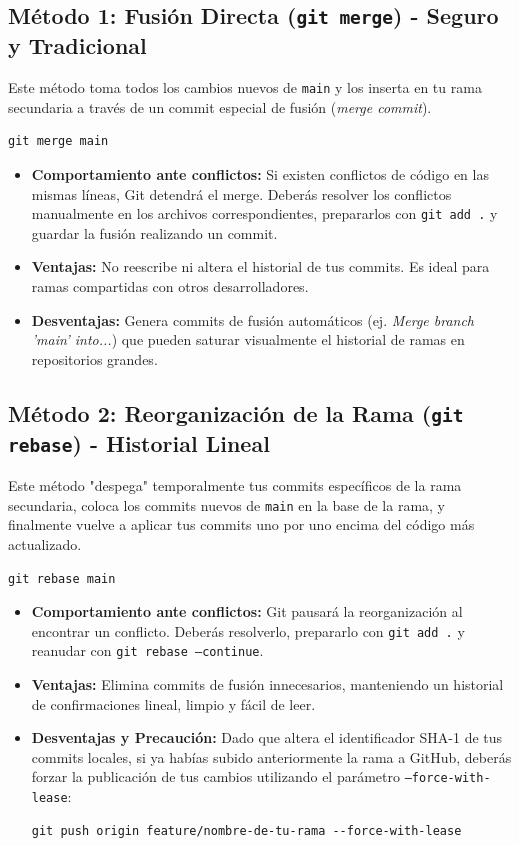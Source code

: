 \documentclass[
10pt, %
a4paper, %
oneside, %
headinclude,footinclude, %
BCOR5mm, %
]{scrartcl}
\begin{document}
\subsection{Método 1: Fusión Directa (\texttt{git merge}) - Seguro y Tradicional}
Este método toma todos los cambios nuevos de \texttt{main} y los inserta en tu rama secundaria a través de un commit especial de fusión (\textit{merge commit}).

\begin{lstlisting}[language=DOS]
git merge main
\end{lstlisting}

\begin{itemize}
	\item \textbf{Comportamiento ante conflictos:} Si existen conflictos de código en las mismas líneas, Git detendrá el merge. Deberás resolver los conflictos manualmente en los archivos correspondientes, prepararlos con \texttt{git add .} y guardar la fusión realizando un commit.
	\item \textbf{Ventajas:} No reescribe ni altera el historial de tus commits. Es ideal para ramas compartidas con otros desarrolladores.
	\item \textbf{Desventajas:} Genera commits de fusión automáticos (ej. \textit{Merge branch 'main' into...}) que pueden saturar visualmente el historial de ramas en repositorios grandes.
\end{itemize}

\subsection{Método 2: Reorganización de la Rama (\texttt{git rebase}) - Historial Lineal}
Este método "despega" temporalmente tus commits específicos de la rama secundaria, coloca los commits nuevos de \texttt{main} en la base de la rama, y finalmente vuelve a aplicar tus commits uno por uno encima del código más actualizado.

\begin{lstlisting}[language=DOS]
git rebase main
\end{lstlisting}

\begin{itemize}
	\item \textbf{Comportamiento ante conflictos:} Git pausará la reorganización al encontrar un conflicto. Deberás resolverlo, prepararlo con \texttt{git add .} y reanudar con \texttt{git rebase --continue}.
	\item \textbf{Ventajas:} Elimina commits de fusión innecesarios, manteniendo un historial de confirmaciones lineal, limpio y fácil de leer.
	\item \textbf{Desventajas y Precaución:} Dado que altera el identificador SHA-1 de tus commits locales, si ya habías subido anteriormente la rama a GitHub, deberás forzar la publicación de tus cambios utilizando el parámetro \texttt{--force-with-lease}:
	\begin{lstlisting}[language=DOS]
	git push origin feature/nombre-de-tu-rama --force-with-lease
	\end{lstlisting}
\end{itemize}
\end{document}
